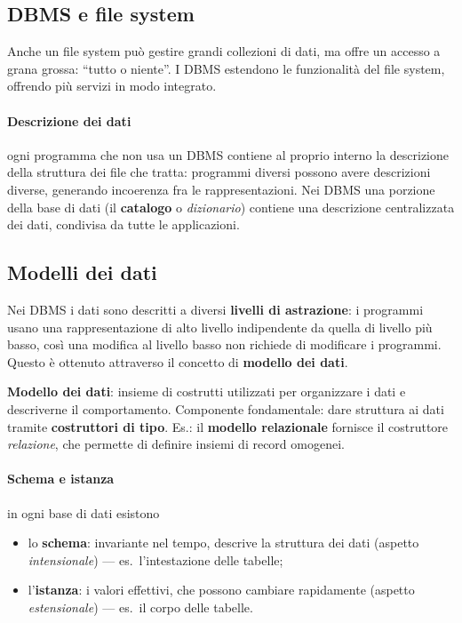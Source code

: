 \documentclass[a4paper,12pt]{article}
\begin{document}
\subsection{DBMS e file system}

Anche un file system può gestire grandi collezioni di dati, ma offre un accesso
a grana grossa: ``tutto o niente''. I DBMS estendono le funzionalità del file
system, offrendo più servizi in modo integrato.

\paragraph{Descrizione dei dati} ogni programma che non usa un DBMS contiene al
proprio interno la descrizione della struttura dei file che tratta: programmi
diversi possono avere descrizioni diverse, generando incoerenza fra le
rappresentazioni. Nei DBMS una porzione della base di dati (il \textbf{catalogo}
o \emph{dizionario}) contiene una descrizione centralizzata dei dati, condivisa
da tutte le applicazioni.

\subsection{Modelli dei dati}

Nei DBMS i dati sono descritti a diversi \textbf{livelli di astrazione}: i
programmi usano una rappresentazione di alto livello indipendente da quella di
livello più basso, così una modifica al livello basso non richiede di modificare
i programmi. Questo è ottenuto attraverso il concetto di \textbf{modello dei
dati}.

\textbf{Modello dei dati}: insieme di costrutti utilizzati per organizzare i dati
e descriverne il comportamento. Componente fondamentale: dare struttura ai dati
tramite \textbf{costruttori di tipo}. Es.: il \textbf{modello relazionale}
fornisce il costruttore \emph{relazione}, che permette di definire insiemi di
record omogenei.

\paragraph{Schema e istanza} in ogni base di dati esistono
\begin{itemize}
  \item lo \textbf{schema}: invariante nel tempo, descrive la struttura dei dati
    (aspetto \emph{intensionale}) --- es.\ l'intestazione delle tabelle;
  \item l'\textbf{istanza}: i valori effettivi, che possono cambiare rapidamente
    (aspetto \emph{estensionale}) --- es.\ il corpo delle tabelle.
\end{itemize}
\end{document}
